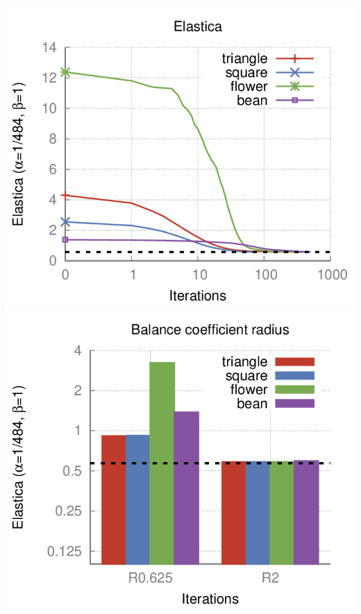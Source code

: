 \begin{frame}
\begin{minipage}{0.74\textwidth}
\includegraphics[scale=0.18]{figures/graphcut/with-neighborhood-flow/plots/elastica.png}\\
\includegraphics[scale=0.18]{figures/graphcut/with-neighborhood-flow/plots/bars.png}
\end{minipage}
\end{frame}

